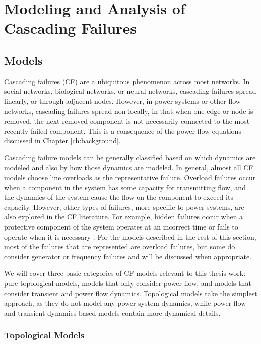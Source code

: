 \chapter{Modeling and Analysis of Cascading Failures}

\label{ch:cf}
\section{Models}


Cascading failures (CF) are a ubiquitous phenomenon across most networks.  In social networks, biological networks, or neural networks, cascading failures spread linearly, or through adjacent nodes.  However, in power systems or other flow networks, cascading failures spread non-locally, in that when one edge or node is removed, the next removed component is not necessarily connected to the most recently failed component.  This is a consequence of the power flow equations discussed in Chapter \ref{ch:background}.

Cascading failure models can be generally classified based on which dynamics are modeled and also by how those dynamics are modeled.  In general, almost all CF models choose line overloads as the representative failure.  Overload failures occur when a component in the system has some capacity for transmitting flow, and the dynamics of the system cause the flow on the component to exceed its capacity.  However, other types of failures, more specific to power systems, are also explored in the CF literature.  For example, hidden failures occur when a protective component of the system operates at an incorrect time or fails to operate when it is necessary \cite{hidden_failures}.  For the models described in the rest of this section, most of the failures that are represented are overload failures, but some do consider generator or frequency failures and will be discussed when appropriate.  


We will cover three basic categories of CF models relevant to this thesis work: pure topological models, models that only consider power flow, and models that consider transient and power flow dynamics.  Topological models take the simplest approach, as they do not model any power system dynamics, while power flow and transient dynamics based models contain more dynamical details.

\subsection{Topological Models}


